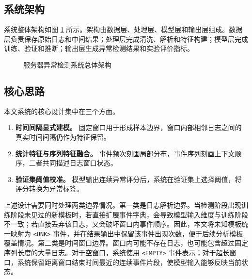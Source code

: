 \subsection{系统架构}

系统整体架构如图 \ref{fig:system_architecture_new} 所示。架构由数据层、处理层、模型层和输出层组成。数据层负责保存原始日志和中间结果；处理层完成清洗、解析和特征构建；模型层完成训练、验证和推断；输出层生成异常检测结果和实验评价指标。

\begin{figure}[htbp]
    \centering
    \caption{服务器异常检测系统总体架构}
    \label{fig:system_architecture_new}
\end{figure}

\subsection{核心思路}

本文系统的核心设计集中在三个方面。

\begin{enumerate}
    \item \textbf{时间间隔显式建模。} 固定窗口用于形成样本边界，窗口内部相邻日志之间的真实时间间隔仍作为特征保留。
    \item \textbf{统计特征与序列特征融合。} 事件频次刻画局部分布，事件序列刻画上下文顺序，二者共同描述日志窗口状态。
    \item \textbf{验证集阈值校准。} 模型输出连续异常评分后，系统在验证集上选择阈值，将评分转换为异常标签。
\end{enumerate}

上述设计需要同时处理两类边界情况。第一类是日志解析边界。当检测阶段出现训练阶段未见过的新模板时，若直接扩展事件字典，会导致模型输入维度与训练阶段不一致；若直接丢弃该日志，又会破坏窗口内事件顺序。因此，本文将未知模板统一映射为 \texttt{<UNK>} 事件，并在结果输出中保留该事件出现次数，便于后续分析模板覆盖情况。第二类是时间窗口边界。窗口内可能不存在日志，也可能包含超过固定序列长度的大量日志。对于空窗口，系统使用 \texttt{<EMPTY>} 事件表示；对于超长窗口，系统保留距离窗口结束时间最近的连续事件片段，使模型输入能够反映当前状态。

